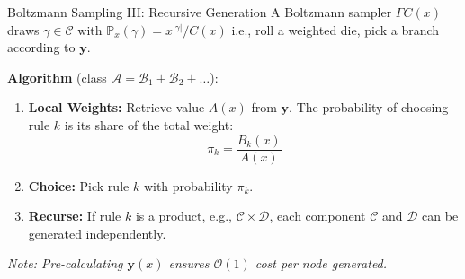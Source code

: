 \documentclass{beamer}
\begin{document}
\begin{frame}{Boltzmann Sampling III: Recursive Generation}
  A Boltzmann sampler $\Gamma C(x)$ draws $\gamma \in \mathcal{C}$ with $\mathbb{P}_x(\gamma) = x^{|\gamma|} / C(x)$
  i.e., roll a weighted die, pick a branch according to $\mathbf{y}$.

\vspace{0.5em}

\textbf{Algorithm} (class $\mathcal{A} = \mathcal{B}_1 + \mathcal{B}_2 + \dots$):
\begin{enumerate}
\item \textbf{Local Weights:} Retrieve value $A(x)$ from $\mathbf{y}$. The probability of choosing rule $k$ is its share of the total weight:
$$ \pi_k = \frac{B_k(x)}{A(x)} $$
\item \textbf{Choice:} Pick rule $k$ with probability $\pi_k$.
\item \textbf{Recurse:} If rule $k$ is a product, e.g., $\mathcal{C} \times \mathcal{D}$, each component $\mathcal{C}$ and $\mathcal{D}$ can be generated independently.
\end{enumerate}

  \vspace{0.5em}
  \textit{Note: Pre-calculating $\mathbf{y}(x)$ ensures $\mathcal{O}(1)$ cost per node generated.}
\end{frame}
\end{document}
